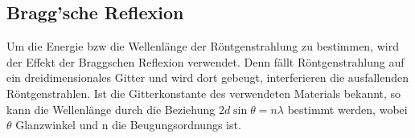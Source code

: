 \subsection{Bragg'sche Reflexion}
    Um die Energie bzw die Wellenlänge der Röntgenstrahlung zu bestimmen, wird der Effekt der Braggschen 
    Reflexion verwendet. Denn fällt Röntgenstrahlung auf ein dreidimensionales Gitter
    und wird dort gebeugt, interferieren die ausfallenden Röntgenstrahlen. Ist die 
    Gitterkonstante des verwendeten Materials bekannt, so kann die Wellenlänge durch
    die Beziehung $2 d \sin{\theta}=n \lambda$ bestimmt werden, wobei $\theta$ Glanzwinkel
    und n die Beugungsordnungs ist.